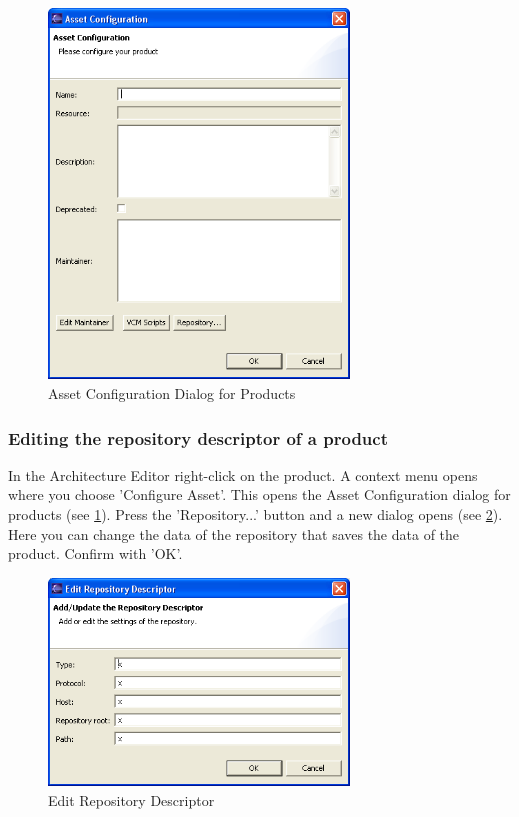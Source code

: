 \begin{figure}[h!]
\begin{center}
\includegraphics[width=8cm]{configp.png}
   \caption{Asset Configuration Dialog for Products}
\label{configp}
\end{center}
\end{figure}\par


\subsubsection{Editing the repository descriptor of a product}
In the Architecture Editor right-click on the product. A context menu opens where
you choose 'Configure Asset'. This opens the Asset Configuration dialog for
products (see \ref{configp}). Press the 'Repository...' button and a new dialog opens (see \ref{repository}).
Here you can change the data of the repository that saves the data of the product. Confirm with 'OK'.

\begin{figure}[h!]
\begin{center}
\includegraphics[width=8cm]{repository.png}
   \caption{Edit Repository Descriptor}
\label{repository}
\end{center}
\end{figure}\par



